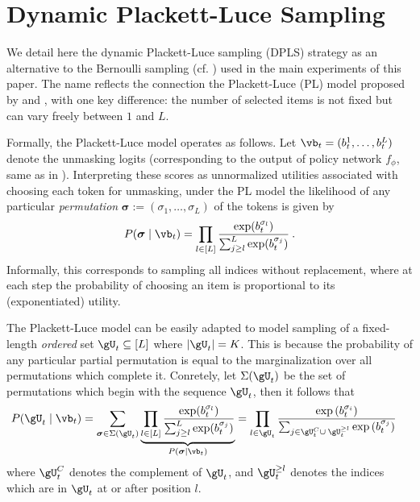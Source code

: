 \section{Dynamic Plackett-Luce Sampling}
\label{sec:appendix-dpls}

We detail here the dynamic Plackett-Luce sampling (DPLS) strategy as an alternative to the Bernoulli sampling (cf. ) used in the main experiments of this paper. The name reflects the connection the Plackett-Luce (PL) model proposed by \cite{luce1959individual} and \cite{plackett1975analysis}, with one key difference: the number of selected items is not fixed but can vary freely between $1$ and $L$.


Formally, the Plackett-Luce model operates as follows. Let $\vb_t = (b_t^1, \ldots, b_t^L)$ denote the unmasking logits (corresponding to the output of policy network $f_\phi$, same as in ).
Interpreting these scores as unnormalized utilities associated with choosing each token for unmasking, under the PL model the likelihood of any particular \emph{permutation} $\boldsymbol{\sigma} := (\sigma_1, \ldots,  \sigma_L)$ of the tokens is given by
\begin{align*}
P(\boldsymbol{\sigma} \mid \vb_t) = \prod_{l \in [L]}\frac{\exp({b^{\sigma_l}_t})}{\sum_{j \ge l}^L \exp({b_t^{\sigma_j}})} \: .
\end{align*}
Informally, this corresponds to sampling all indices without replacement, where at each step the probability of choosing an item is proportional to its (exponentiated) utility.

The Plackett-Luce model can be easily adapted to model sampling of a fixed-length \emph{ordered} set $\gU_t \subseteq [L]$ where $|\gU_t| = K$. This is because the probability of any particular partial permutation is equal to the marginalization over all permutations which complete it. %
Conretely, let $\Sigma(\gU_t)$ be the set of permutations which begin with the sequence $\gU_t$, then it follows that
\begin{align*}
P(\gU_t \mid \vb_t) &= \sum_{\boldsymbol{\sigma} \in \Sigma(\gU_t)}\underbrace{\prod_{l \in [L]}\frac{\exp({b^{\sigma_l}_t})}{\sum_{j \ge l}^L \exp({b_t^{\sigma_j}})}}_{P(\boldsymbol{\sigma} | \vb_t)} = \prod_{l \in \gU_t} \frac{\exp{(b_t^{\sigma_i})}}{\sum_{j \in \gU_t^C \cup \: \gU_t^{\geq l}} \exp{(b_t^{\sigma_j})}}
\end{align*}
where $\gU_t^C$ denotes the complement of $\gU_t$, and $\gU_t^{\geq l}$ denotes the indices which are in $\gU_t$ at or after position $l$.


